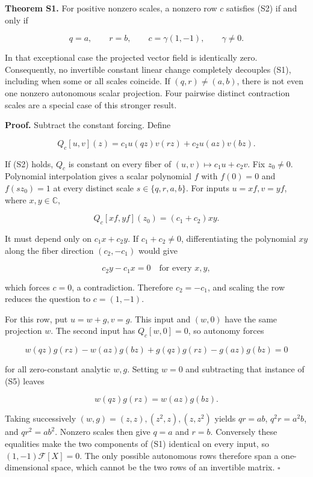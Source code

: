 \textbf{Theorem S1.} For positive nonzero scales, a nonzero row \(c\)
satisfies (S2) if and only if

\[
q=a,\qquad r=b,\qquad c=\gamma(1,-1),\qquad\gamma\ne0.
\tag{S3}
\]

In that exceptional case the projected vector field is identically zero.
Consequently, no invertible constant linear change completely decouples
(S1), including when some or all scales coincide. If \((q,r)\ne(a,b)\),
there is not even one nonzero autonomous scalar projection. Four
pairwise distinct contraction scales are a special case of this stronger
result.

\textbf{Proof.} Subtract the constant forcing. Define

\[
Q_c[u,v](z)=c_1u(qz)v(rz)+c_2u(az)v(bz).
\]

If (S2) holds, \(Q_c\) is constant on every fiber of
\((u,v)\mapsto c_1u+c_2v\). Fix \(z_0\ne0\). Polynomial interpolation
gives a scalar polynomial \(f\) with \(f(0)=0\) and \(f(sz_0)=1\) at
every distinct scale \(s\in\{q,r,a,b\}\). For inputs \(u=xf,v=yf\),
where \(x,y\in\mathbb C\),

\[
Q_c[xf,yf](z_0)=(c_1+c_2)xy.
\tag{S4}
\]

It must depend only on \(c_1x+c_2y\). If \(c_1+c_2\ne0\),
differentiating the polynomial \(xy\) along the fiber direction
\((c_2,-c_1)\) would give

\[
c_2y-c_1x=0\quad\text{for every }x,y,
\]

which forces \(c=0\), a contradiction. Therefore \(c_2=-c_1\), and
scaling the row reduces the question to \(c=(1,-1)\).

For this row, put \(u=w+g,v=g\). This input and \((w,0)\) have the same
projection \(w\). The second input has \(Q_c[w,0]=0\), so autonomy
forces

\[
w(qz)g(rz)-w(az)g(bz)
+g(qz)g(rz)-g(az)g(bz)=0
\tag{S5}
\]

for all zero-constant analytic \(w,g\). Setting \(w=0\) and subtracting
that instance of (S5) leaves

\[
w(qz)g(rz)=w(az)g(bz).
\tag{S6}
\]

Taking successively \((w,g)=(z,z),(z^2,z),(z,z^2)\) yields \(qr=ab\),
\(q^2r=a^2b\), and \(qr^2=ab^2\). Nonzero scales then give \(q=a\) and
\(r=b\). Conversely these equalities make the two components of (S1)
identical on every input, so \((1,-1)\mathcal F[X]=0\). The only
possible autonomous rows therefore span a one-dimensional space, which
cannot be the two rows of an invertible matrix. \(\square\)

